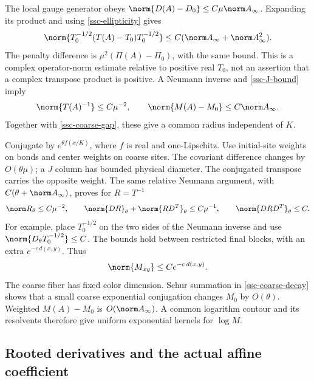 The local gauge generator obeys
\(\norm{D(A)-D_0}\le C\mu\norm A_\infty\). Expanding its product
and using \eqref{ssc-ellipticity} gives
\begin{equation}
 \norm{T_0^{-1/2}(T(A)-T_0)T_0^{-1/2}}
       \le C(\norm A_\infty+\norm A_\infty^2).
 \label{ssc-relative}
\end{equation}
The penalty difference is \(\mu^2(\Pi(A)-\Pi_0)\), with the same
bound. This is a complex operator-norm estimate relative to positive
real \(T_0\), not an assertion that a complex transpose product is
positive. A Neumann inverse and \eqref{ssc-J-bound} imply
\[
 \norm{T(A)^{-1}}\le C\mu^{-2},\qquad
 \norm{M(A)-M_0}\le C\norm A_\infty .
\]
Together with \eqref{ssc-coarse-gap}, these give a common radius
independent of \(K\).

Conjugate by \(e^{\theta f(x/K)}\), where \(f\) is real and
one-Lipschitz. Use initial-site weights on bonds and center weights
on coarse sites. The covariant difference changes by \(O(\theta\mu)\);
a \(J\) column has bounded physical diameter. The conjugated
transpose carries the opposite weight. The same relative Neumann
argument, with \(C(\theta+\norm A_\infty)\), proves for \(R=T^{-1}\)
\begin{equation}
 \norm R_\theta\le C\mu^{-2},\qquad
 \norm{DR}_\theta+\norm{RD^T}_\theta\le C\mu^{-1},
 \qquad \norm{DRD^T}_\theta\le C .
 \label{ssc-weighted-energy}
\end{equation}
For example, place \(T_0^{-1/2}\) on the two sides of the Neumann
inverse and use \(\norm{D_\theta T_0^{-1/2}}\le C\).
The bounds hold between restricted final blocks, with an extra
\(e^{-c\,d(x,y)}\). Thus
\begin{equation}
 \norm{M_{xy}}\le Ce^{-c\,d(x,y)}.
 \label{ssc-coarse-decay}
\end{equation}
The coarse fiber has fixed color dimension. Schur summation in
\eqref{ssc-coarse-decay} shows that a small coarse exponential
conjugation changes \(M_0\) by \(O(\theta)\). Weighted \(M(A)-M_0\)
is \(O(\norm A_\infty)\). A common logarithm contour and its
resolvents therefore give uniform exponential kernels for \(\log M\).

\subsection{Rooted derivatives and the actual affine coefficient}

